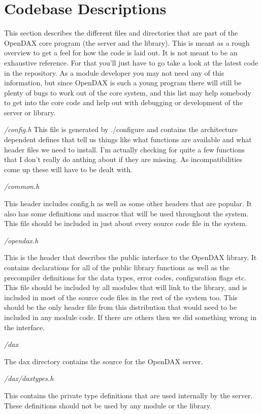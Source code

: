 \chapter{Codebase Descriptions}
This section describes the different files and directories that are part of the OpenDAX core program (the server and the library).  This is meant as a rough overview to get a feel for how the code is laid out.  It is not meant to be an exhaustive reference.  For that you'll just have to go take a look at the latest code in the repository.  As a module developer you may not need any of this information, but since OpenDAX is such a young program there will still be plenty of bugs to work out of the core system, and this list may help somebody to get into the core code and help out with debugging or development of the server or library.

\emph{/config.h}
This file is generated by ./configure and contains the architecture dependent defines that tell us things like what functions are available and what header files we need to install. I'm actually checking for quite a few functions that I don't really do anthing about if they are missing. As incompatibilities come up these will have to be dealt with.

\emph{/common.h}

This header includes config.h as well as some other headers that are popular. It also has some definitions and macros that will be used throughout the system. This file should be included in just about every source code file in the system.

\emph{/opendax.h}

This is the header that describes the public interface to the OpenDAX library. It contains declarations for all of the public library functions as well as the precompiler definitions for the data types, error codes, configuration flags etc. This file should be included by all modules that will link to the library, and is included in most of the source code files in the rest of the system too. This should be the only header file from this distribution that would need to be included in any module code. If there are others then we did something wrong in the interface.

\emph{/dax}

The dax directory contains the source for the OpenDAX server.

\emph{/dax/daxtypes.h}

This contains the private type definitions that are used internally by the server. These definitions should not be used by any module or the library.

